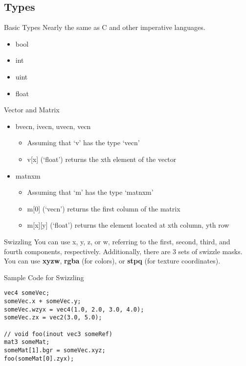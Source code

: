 \subsection{Types}

\begin{frame}{Basic Types}
    Nearly the same as C and other imperative languages.
    \begin{itemize}
        \item bool
        \item int
        \item uint
        \item float
    \end{itemize}
\end{frame}

\begin{frame}{Vector and Matrix}
    \begin{itemize}
        \item bvecn, ivecn, uvecn, vecn
        \begin{itemize}
            \item Assuming that `v' has the type `vecn'
            \item v[x] (`float') returns the xth element of the vector
        \end{itemize}
        \item matnxm
        \begin{itemize}
            \item Assuming that `m' has the type `matnxm'
            \item m[0] (`vecn') returns the first column of the matrix
            \item m[x][y] (`float') returns the element located at xth column, yth row
        \end{itemize}
    \end{itemize}
\end{frame}

\begin{frame}{Swizzling}
    You can use x, y, z, or w, referring to the first, second, third, 
    and fourth components, respectively. Additionally, there are 3 sets 
    of swizzle masks. You can use \textbf{xyzw}, \textbf{rgba} (for colors), 
    or \textbf{stpq} (for texture coordinates).
\end{frame}

\begin{frame}[fragile]{Sample Code for Swizzling}
    \begin{lstlisting}
vec4 someVec;
someVec.x + someVec.y;
someVec.wzyx = vec4(1.0, 2.0, 3.0, 4.0);
someVec.zx = vec2(3.0, 5.0);
 
// void foo(inout vec3 someRef)
mat3 someMat;
someMat[1].bgr = someVec.xyz;
foo(someMat[0].zyx);
    \end{lstlisting}
\end{frame}

